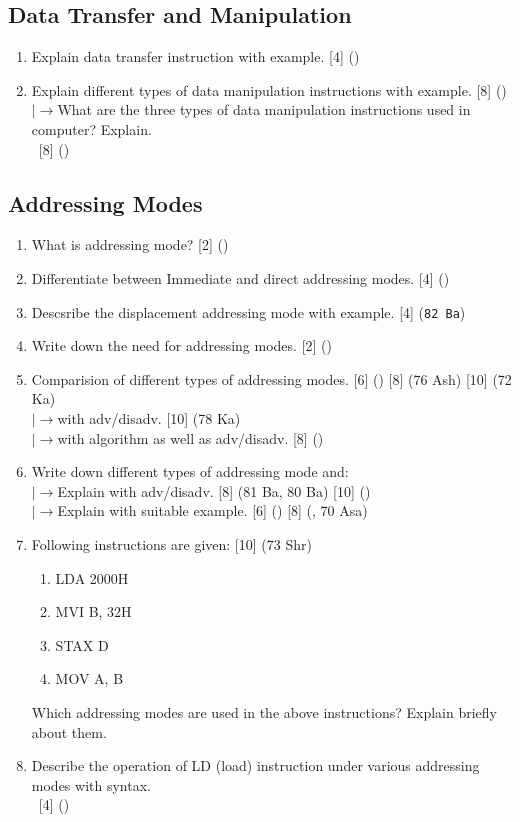 \documentclass[12pt]{article}
\newcommand{\lb}{\\$\left|\rightarrow\right.$}
\newcommand{\enter}{\\\textcolor{white}{1}}
\begin{document}
	\subsection{Data Transfer and Manipulation}
	\begin{enumerate}
		\item Explain data transfer instruction with example. \hfill [4] ()
		
		\item Explain different types of data manipulation instructions with example. \hfill [8] ()
		\lb What are the three types of data manipulation instructions used in computer? Explain. 
		\enter\hfill [8] ()
	\end{enumerate}
	\subsection{Addressing Modes}
	\begin{enumerate}
		\item What is addressing mode? \hfill [2] ()
		
		\item Differentiate between Immediate and direct addressing modes. \hfill [4] ()
		
		\item Descsribe the displacement addressing mode with example. \hfill [4] (\texttt{82 Ba})

		\item Write down the need for addressing modes. \hfill [2] ()
		
		\item Comparision of different types of addressing modes. \hfill [6] () [8] (76 Ash) [10] (72 Ka)
		\lb with adv/disadv. \hfill [10] (78 Ka)
		\lb with algorithm as well as adv/disadv. \hfill [8] ()
		
		\item Write down different types of addressing mode and:
		\lb Explain with adv/disadv. \hfill [8] (81 Ba, 80 Ba) [10] ()
		\lb Explain with suitable example. \hfill [6] () [8] (, 70 Asa)
			
		\item Following instructions are given: \hfill [10] (73 Shr)
		\begin{enumerate}[noitemsep, topsep = 0pt, label = \alph*.]
			\item LDA 2000H
			\item MVI B, 32H
			\item STAX D
			\item MOV A, B
		\end{enumerate}
		Which addressing modes are used in the above instructions? Explain briefly about them.
		
		\item Describe the operation of LD (load) instruction under various addressing modes with syntax. 
		\enter\hfill [4] ()
	\end{enumerate}
\end{document}
